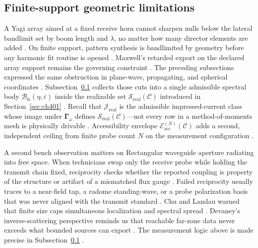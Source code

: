 \subsection{Finite-support geometric limitations}
\label{sec:ch444}
A Yagi array aimed at a fixed receive horn cannot sharpen nulls below the lateral bandlimit set by boom length and $\lambda$, no matter how many director elements are added \cite{harrington2001}. On finite support, pattern synthesis is bandlimited by geometry before any harmonic fit routine is opened \cite{stratton1941}. Maxwell's retarded export on the declared array support remains the governing constraint \cite{maxwell1873}.
The preceding subsections expressed the same obstruction in plane-wave, propagating, and spherical coordinates \cite{hansen1988}. Subsection~\ref{sec:ch444} collects those cuts into a single admissible spectral body $\mathcal{B}_{\mathrm{fs}}(\eta,\varepsilon)$ inside the realizable set $\mathcal{S}_{\mathrm{real}}(\mathcal{C})$ introduced in Section~\ref{sec:ch401} \cite{stratton1941}. Recall that $\mathcal{J}_{\mathrm{real}}$ is the admissible impressed-current class whose image under $\boldsymbol{\Gamma}_\omega$ defines $\mathcal{S}_{\mathrm{real}}(\mathcal{C})$---not every row in a method-of-moments mesh is physically drivable \cite{harrington2001}. Accessibility envelope $\mathcal{E}_{\mathrm{acc}}^{(N)}(\mathcal{C})$ adds a second, independent ceiling from finite probe count $N$ on the measurement configuration \cite{devaney2004}.
\begin{physicalvignette}
A second bench observation matters on Rectangular waveguide aperture radiating into free space. When technicians swap only the receive probe while holding the transmit chain fixed, reciprocity checks whether the reported coupling is property of the structure or artifact of a mismatched flux gauge \cite{stratton1941}. Failed reciprocity usually traces to a near-field tap, a radome standing-wave, or a probe polarization basis that was never aligned with the transmit standard \cite{hansen1988}.
Chu and Landau warned that finite size caps simultaneous localization and spectral spread \cite{chu1948}. Devaney's inverse-scattering perspective reminds us that reachable far-zone data never exceeds what bounded sources can export \cite{devaney2004}.
The measurement logic above is made precise in Subsection~\ref{sec:ch444} \cite{stratton1941}.
\end{physicalvignette}
